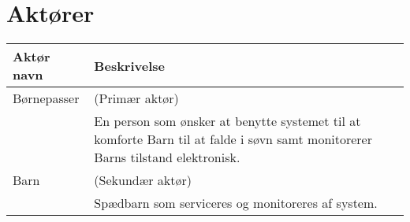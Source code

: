 \section{Aktører}



\begin{table}[!htbp] \centering
	\begin{tabular}{|p{2.5cm}|p{11.5cm}|}
	\hline
		\textbf{Aktør navn} & \textbf{Beskrivelse} \\\hline
		Børnepasser & (Primær aktør) \\ & En person som ønsker at benytte systemet til at komforte Barn til at falde i søvn samt monitorerer Barns tilstand elektronisk.
		\\\hline
		Barn & (Sekundær aktør) \\ & Spædbarn som serviceres og monitoreres af system.
		\\\hline
	\end{tabular}
\end{table}